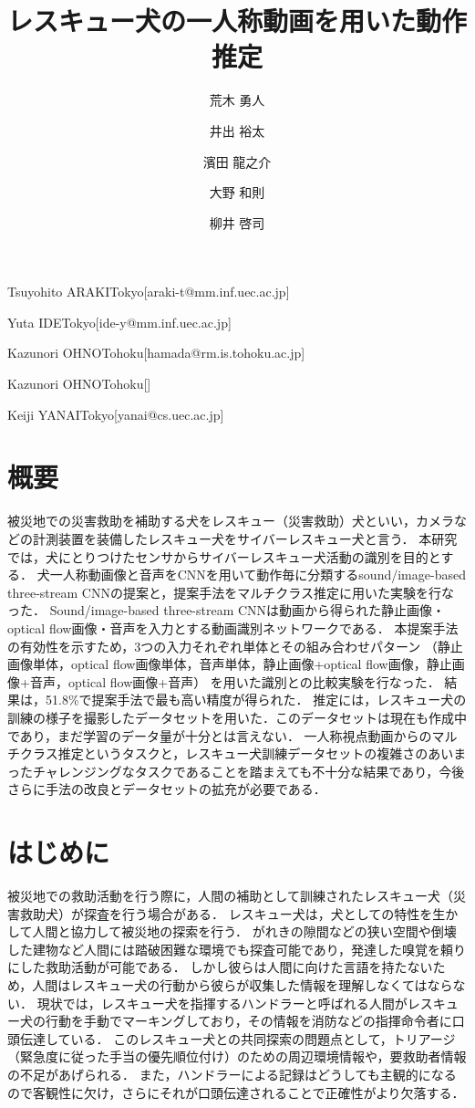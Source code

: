 \documentclass[MIRU,submit]{miru2019j}
\begin{document}
\title{レスキュー犬の一人称動画を用いた動作推定}


 \author{荒木 勇人}{Tsuyohito ARAKI}{Tokyo}[araki-t@mm.inf.uec.ac.jp]
 \author{井出 裕太}{Yuta IDE}{Tokyo}[ide-y@mm.inf.uec.ac.jp]
 \author{濱田 龍之介}{Kazunori OHNO}{Tohoku}[hamada@rm.is.tohoku.ac.jp]
 \author{大野 和則}{Kazunori OHNO}{Tohoku}[]
 \author{柳井 啓司}{Keiji YANAI}{Tokyo}[yanai@cs.uec.ac.jp]


\maketitle
\section*{概要}
被災地での災害救助を補助する犬をレスキュー（災害救助）犬といい，カメラなどの計測装置を装備したレスキュー犬をサイバーレスキュー犬と言う．
本研究では，犬にとりつけたセンサからサイバーレスキュー犬活動の識別を目的とする．
犬一人称動画像と音声をCNNを用いて動作毎に分類するsound/image-based three-stream CNNの提案と，提案手法をマルチクラス推定に用いた実験を行なった．
Sound/image-based three-stream CNNは動画から得られた静止画像・optical flow画像・音声を入力とする動画識別ネットワークである．
本提案手法の有効性を示すため，3つの入力それぞれ単体とその組み合わせパターン
（静止画像単体，optical flow画像単体，音声単体，静止画像+optical flow画像，静止画像+音声，optical flow画像+音声）
を用いた識別との比較実験を行なった．
結果は，51.8\%で提案手法で最も高い精度が得られた．
推定には，レスキュー犬の訓練の様子を撮影したデータセットを用いた．このデータセットは現在も作成中であり，まだ学習のデータ量が十分とは言えない．
一人称視点動画からのマルチクラス推定というタスクと，レスキュー犬訓練データセットの複雑さのあいまったチャレンジングなタスクであることを踏まえても不十分な結果であり，今後さらに手法の改良とデータセットの拡充が必要である．

\section{はじめに}
被災地での救助活動を行う際に，人間の補助として訓練されたレスキュー犬（災害救助犬）が探査を行う場合がある．
レスキュー犬は，犬としての特性を生かして人間と協力して被災地の探索を行う．
がれきの隙間などの狭い空間や倒壊した建物など人間には踏破困難な環境でも探査可能であり，発達した嗅覚を頼りにした救助活動が可能である．
しかし彼らは人間に向けた言語を持たないため，人間はレスキュー犬の行動から彼らが収集した情報を理解しなくてはならない．
現状では，レスキュー犬を指揮するハンドラーと呼ばれる人間がレスキュー犬の行動を手動でマーキングしており，その情報を消防などの指揮命令者に口頭伝達している．
このレスキュー犬との共同探索の問題点として，トリアージ（緊急度に従った手当の優先順位付け）のための周辺環境情報や，要救助者情報の不足があげられる．
また，ハンドラーによる記録はどうしても主観的になるので客観性に欠け，さらにそれが口頭伝達されることで正確性がより欠落する．
\end{document}
